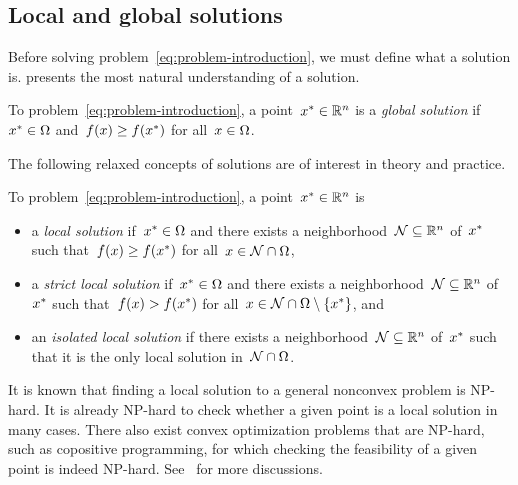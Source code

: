 \subsection{Local and global solutions}

Before solving problem~\cref{eq:problem-introduction}, we must define what a solution is.
 presents the most natural understanding of a solution.

\begin{definition}
    \label{def:global-solution}
    To problem~\cref{eq:problem-introduction}, a point~$\iter[\ast] \in \R^n$ is a \emph{global solution} if~$\iter[\ast] \in \fset$ and~$\obj(\iter) \ge \obj(\iter[\ast])$ for all~$\iter \in \fset$.
\end{definition}

The following relaxed concepts of solutions are of interest in theory and practice.

\begin{definition}
    To problem~\cref{eq:problem-introduction}, a point~$\iter[\ast] \in \R^n$ is
    \begin{itemize}
        \item a \emph{local solution} if~$\iter[\ast] \in \fset$ and there exists a neighborhood~$\mathcal{N} \subseteq \mathbb{R}^n$ of~$\iter[\ast]$ such that~$\obj(\iter) \ge \obj(\iter[\ast])$ for all~$\iter \in \mathcal{N} \cap \fset$,
        \item a \emph{strict local solution} if~$\iter[\ast] \in \fset$ and there exists a neighborhood~$\mathcal{N} \subseteq \mathbb{R}^n$ of~$\iter[\ast]$ such that~$\obj(\iter) > \obj(\iter[\ast])$ for all~$\iter \in \mathcal{N} \cap \fset \setminus \set{\iter[\ast]}$, and
        \item an \emph{isolated local solution} if there exists a neighborhood~$\mathcal{N} \subseteq \mathbb{R}^n$ of~$\iter[\ast]$ such that it is the only local solution in~$\mathcal{N} \cap \Omega$.
    \end{itemize}
\end{definition}

It is known that finding a local solution to a general nonconvex problem is NP-hard.
It is already NP-hard to check whether a given point is a local solution in many cases.
There also exist convex optimization problems that are NP-hard, such as copositive programming, for which checking the feasibility of a given point is indeed NP-hard.
See~\cite{Murty_Kabadi_1987} for more discussions.

